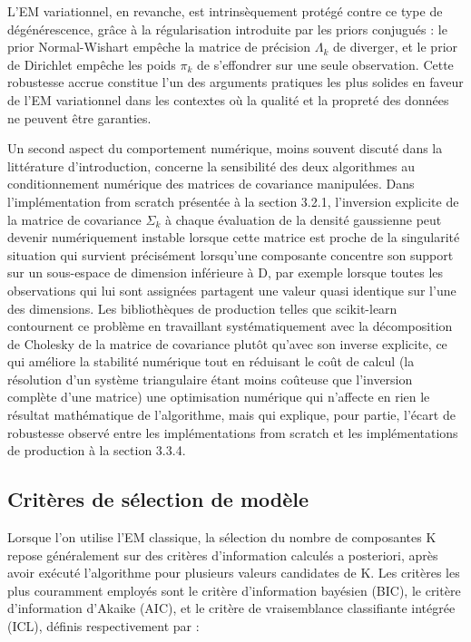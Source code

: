 L'EM variationnel, en revanche, est intrinsèquement protégé contre ce type de dégénérescence, grâce à la régularisation introduite par les priors conjugués : le prior Normal-Wishart empêche la matrice de précision $\Lambda _{k}$ de diverger, et le prior de Dirichlet empêche les poids $\pi _{k}$ de s'effondrer sur une seule observation. Cette robustesse accrue constitue l'un des arguments pratiques les plus solides en faveur de l'EM variationnel dans les contextes où la qualité et la propreté des données ne peuvent être garanties.

Un second aspect du comportement numérique, moins souvent discuté dans la littérature d'introduction, concerne la sensibilité des deux algorithmes au conditionnement numérique des matrices de covariance manipulées. Dans l'implémentation from scratch présentée à la section 3.2.1, l'inversion explicite de la matrice de covariance $\Sigma _{k}$ à chaque évaluation de la densité gaussienne peut devenir numériquement instable lorsque cette matrice est proche de la singularité  situation qui survient précisément lorsqu'une composante concentre son support sur un sous-espace de dimension inférieure à D, par exemple lorsque toutes les observations qui lui sont assignées partagent une valeur quasi identique sur l'une des dimensions. Les bibliothèques de production telles que scikit-learn contournent ce problème en travaillant systématiquement avec la décomposition de Cholesky de la matrice de covariance plutôt qu'avec son inverse explicite, ce qui améliore la stabilité numérique tout en réduisant le coût de calcul (la résolution d'un système triangulaire étant moins coûteuse que l'inversion complète d'une matrice)  une optimisation numérique qui n'affecte en rien le résultat mathématique de l'algorithme, mais qui explique, pour partie, l'écart de robustesse observé entre les implémentations from scratch et les implémentations de production à la section 3.3.4.

\subsection{Critères de sélection de modèle}
Lorsque l'on utilise l'EM classique, la sélection du nombre de composantes K repose généralement sur des critères d'information calculés a posteriori, après avoir exécuté l'algorithme pour plusieurs valeurs candidates de K. Les critères les plus couramment employés sont le critère d'information bayésien (BIC), le critère d'information d'Akaike (AIC), et le critère de vraisemblance classifiante intégrée (ICL), définis respectivement par :

